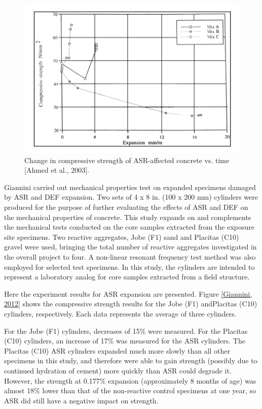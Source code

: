 \begin{figure}[h!]
  \centering
  \includegraphics[width=0.8\linewidth]{Reference/temp2.png}
  \caption{Change in compressive strength of ASR-affected concrete vs. time [Ahmed et al., 2003].}
  \label{Ahmed et al., 2003 2}
\end{figure}

\clearpage

Giannini\cite{GIANNINI} carried out mechanical properties test on expanded specimens damaged by ASR and DEF expansion. Two sets of 4 x 8 in. (100 x 200 mm) cylinders were produced for the purpose of further evaluating the effects of ASR and DEF on the mechanical properties of concrete. This study expands on and complements the mechanical tests conducted on the core samples extracted from the exposure site specimens. Two reactive aggregates, Jobe (F1) sand and Placitas (C10) gravel were used, bringing the total number of reactive aggregates investigated in the overall project to four. A non-linear resonant frequency test method was also employed for selected test specimens. In this study, the cylinders are intended to represent a laboratory analog for core samples extracted from a field structure.

Here the experiment results for ASR expansion are presented. Figure \ref{Giannini, 2012} shows the compressive strength results for the Jobe (F1) andPlacitas (C10) cylinders, respectively. Each data represents the average of three cylinders.

For the Jobe (F1) cylinders, decreases of 15\% were measured. For the Placitas (C10) cylinders, an increase of 17\% was measured for the ASR cylinders. The Placitas (C10) ASR cylinders expanded much more slowly than all other specimens in this study, and therefore were able to gain strength (possibly due to continued hydration of cement) more quickly than ASR could degrade it. However, the strength at 0.177\% expansion (approximately 8 months of age) was almost 18\% lower than that of the non-reactive control specimens at one year, so ASR did still have a negative impact on strength.


